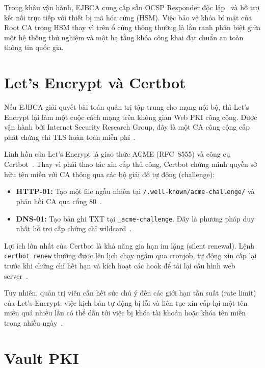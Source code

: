 Trong khâu vận hành, EJBCA cung cấp sẵn OCSP Responder độc lập~\cite{EJBCAOCSP} và hỗ trợ kết nối trực tiếp với thiết bị mã hóa cứng (HSM). Việc bảo vệ khóa bí mật của Root CA trong HSM thay vì trên ổ cứng thông thường là lằn ranh phân biệt giữa một hệ thống thử nghiệm và một hạ tầng khóa công khai đạt chuẩn an toàn thông tin quốc gia.

\section{Let’s Encrypt và Certbot}
\label{sec:6.5}

Nếu EJBCA giải quyết bài toán quản trị tập trung cho mạng nội bộ, thì Let’s Encrypt lại làm một cuộc cách mạng trên không gian Web PKI công cộng. Được vận hành bởi Internet Security Research Group, đây là một CA công cộng cấp phát chứng chỉ TLS hoàn toàn miễn phí~\cite{LetsEncryptDocs}.

Linh hồn của Let's Encrypt là giao thức ACME (RFC~8555) và công cụ Certbot~\cite{CertbotDocs}. Thay vì phải thao tác xin cấp thủ công, Certbot chứng minh quyền sở hữu tên miền với CA thông qua các bộ giải đố tự động (challenge):
\begin{itemize}
    \item \textbf{HTTP-01:} Tạo một file ngẫu nhiên tại \texttt{/.well-known/acme-challenge/} và phản hồi CA qua cổng 80~\cite{LetsEncryptChallenges}.
    \item \textbf{DNS-01:} Tạo bản ghi TXT tại \texttt{\_acme-challenge}. Đây là phương pháp duy nhất hỗ trợ cấp chứng chỉ wildcard~\cite{LetsEncryptChallenges}.
\end{itemize}

Lợi ích lớn nhất của Certbot là khả năng gia hạn im lặng (silent renewal). Lệnh \texttt{certbot renew} thường được lên lịch chạy ngầm qua cronjob, tự động xin cấp lại trước khi chứng chỉ hết hạn và kích hoạt các hook để tải lại cấu hình web server~\cite{CertbotDocs}. 

Tuy nhiên, quản trị viên cần hết sức chú ý đến các giới hạn tần suất (rate limit) của Let's Encrypt: việc kịch bản tự động bị lỗi và liên tục xin cấp lại một tên miền quá nhiều lần có thể dẫn tới việc bị khóa tài khoản hoặc khóa tên miền trong nhiều ngày~\cite{LetsEncryptRateLimits}.

\section{Vault PKI}
\label{sec:6.6}


